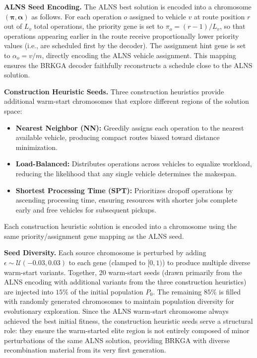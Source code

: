 \documentclass{article}
\begin{document}
\textbf{ALNS Seed Encoding.} The ALNS best solution is encoded into a chromosome $(\boldsymbol{\pi}, \boldsymbol{\alpha})$ as follows. For each operation $o$ assigned to vehicle $v$ at route position $r$ out of $L_v$ total operations, the priority gene is set to $\pi_o = (r - 1) / L_v$, so that operations appearing earlier in the route receive proportionally lower priority values (i.e., are scheduled first by the decoder). The assignment hint gene is set to $\alpha_o = v / m$, directly encoding the ALNS vehicle assignment. This mapping ensures the BRKGA decoder faithfully reconstructs a schedule close to the ALNS solution.

\textbf{Construction Heuristic Seeds.} Three construction heuristics provide additional warm-start chromosomes that explore different regions of the solution space:

\begin{itemize}
    \item \textbf{Nearest Neighbor (NN):} Greedily assigns each operation to the nearest available vehicle, producing compact routes biased toward distance minimization.
    \item \textbf{Load-Balanced:} Distributes operations across vehicles to equalize workload, reducing the likelihood that any single vehicle determines the makespan.
    \item \textbf{Shortest Processing Time (SPT):} Prioritizes dropoff operations by ascending processing time, ensuring resources with shorter jobs complete early and free vehicles for subsequent pickups.
\end{itemize}

Each construction heuristic solution is encoded into a chromosome using the same priority/assignment gene mapping as the ALNS seed.

\textbf{Seed Diversity.} Each source chromosome is perturbed by adding $\epsilon \sim \mathcal{U}(-0.03, 0.03)$ to each gene (clamped to $[0,1)$) to produce multiple diverse warm-start variants. Together, 20 warm-start seeds (drawn primarily from the ALNS encoding with additional variants from the three construction heuristics) are injected into $15\%$ of the initial population $P_0$. The remaining $85\%$ is filled with randomly generated chromosomes to maintain population diversity for evolutionary exploration. Since the ALNS warm-start chromosome always achieved the best initial fitness, the construction heuristic seeds serve a structural role: they ensure the warm-started elite region is not entirely composed of minor perturbations of the same ALNS solution, providing BRKGA with diverse recombination material from its very first generation.
\end{document}

